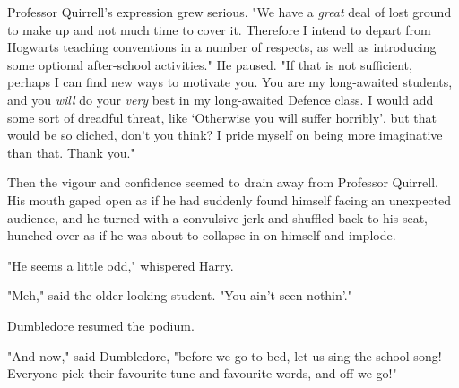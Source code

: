 Professor Quirrell's expression grew serious. "We have a \emph{great} deal of
lost ground to make up and not much time to cover it. Therefore I intend to
depart from Hogwarts teaching conventions in a number of respects, as well as
introducing some optional after-school activities." He paused. "If that is not
sufficient, perhaps I can find new ways to motivate you. You are my
long-awaited students, and you \emph{will} do your \emph{very} best in my
long-awaited Defence class. I would add some sort of dreadful threat, like
`Otherwise you will suffer horribly', but that would be so cliched, don't you
think? I pride myself on being more imaginative than that. Thank you."

Then the vigour and confidence seemed to drain away from Professor Quirrell.
His mouth gaped open as if he had suddenly found himself facing an unexpected
audience, and he turned with a convulsive jerk and shuffled back to his seat,
hunched over as if he was about to collapse in on himself and implode.

"He seems a little odd," whispered Harry.

"Meh," said the older-looking student. "You ain't seen nothin'."

Dumbledore resumed the podium.

"And now," said Dumbledore, "before we go to bed, let us sing the school song!
Everyone pick their favourite tune and favourite words, and off we go!"
